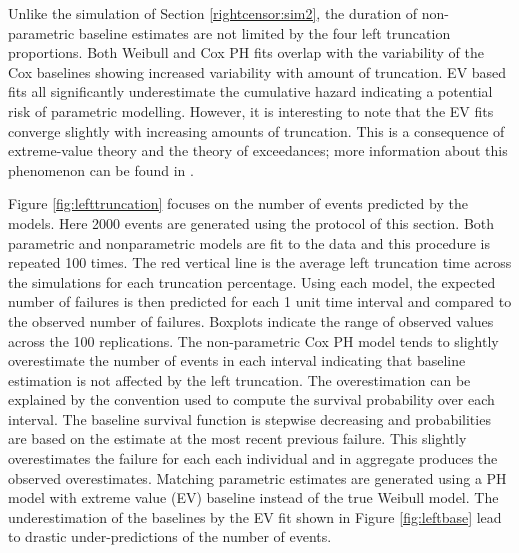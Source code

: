 Unlike the simulation of Section \ref{rightcensor:sim2}, the duration of non-parametric baseline estimates are not limited by the four left truncation proportions.  Both Weibull and Cox PH fits overlap with the variability of the Cox baselines showing increased variability with amount of truncation.  EV based fits all significantly underestimate the cumulative hazard indicating a potential risk of parametric modelling.  However, it is interesting to note that the EV fits converge slightly with increasing amounts of truncation.  This is a consequence of extreme-value theory and the theory of exceedances; more information about this phenomenon can be found in \citet{coles2001}.

Figure \ref{fig:lefttruncation} focuses on the number of events predicted by the models. Here 2000 events are generated using the protocol of this section. Both parametric and nonparametric models are fit to the data and this procedure is repeated 100 times. The red vertical line is the average left truncation time across the simulations for each truncation percentage.  Using each model, the expected number of failures is then predicted for each 1 unit time interval and compared to the observed number of failures. Boxplots indicate the range of observed values across the 100 replications. The non-parametric Cox PH model tends to slightly overestimate the number of events in each interval indicating that baseline estimation is not affected by the left truncation.  The overestimation can be explained by the convention used to compute the survival probability over each interval.  The baseline survival function is stepwise decreasing and probabilities are based on the estimate at the most recent previous failure.  This slightly overestimates the failure for each each individual and in aggregate produces the observed overestimates.
Matching parametric estimates are generated using a PH model with extreme value (EV) baseline instead of the true Weibull model.  The underestimation of the baselines by the EV fit shown in Figure \ref{fig:leftbase} lead to drastic under-predictions of the number of events.


